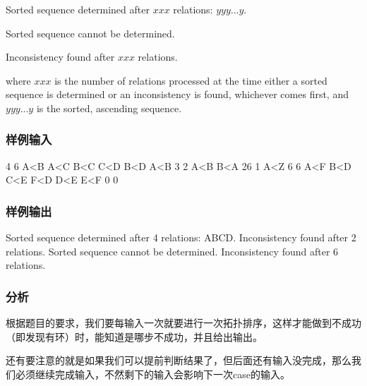Sorted sequence determined after $xxx$ relations: $yyy...y$.

Sorted sequence cannot be determined. 

Inconsistency found after $xxx$ relations.

where $xxx$ is the number of relations processed at the time either a sorted sequence is determined or an inconsistency is found, whichever comes first, and $yyy...y$ is the sorted, ascending sequence.

\subsubsection{样例输入}
\begin{Code}
4 6
A<B
A<C
B<C
C<D
B<D
A<B
3 2
A<B
B<A
26 1
A<Z
6 6
A<F
B<D
C<E
F<D
D<E
E<F
0 0
\end{Code}

\subsubsection{样例输出}
\begin{Code}
Sorted sequence determined after 4 relations: ABCD.
Inconsistency found after 2 relations.
Sorted sequence cannot be determined.
Inconsistency found after 6 relations.
\end{Code}

\subsubsection{分析}
根据题目的要求，我们要每输入一次就要进行一次拓扑排序，这样才能做到不成功（即发现有环）时，能知道是哪步不成功，并且给出输出。

还有要注意的就是如果我们可以提前判断结果了，但后面还有输入没完成，那么我们必须继续完成输入，不然剩下的输入会影响下一次case的输入。

